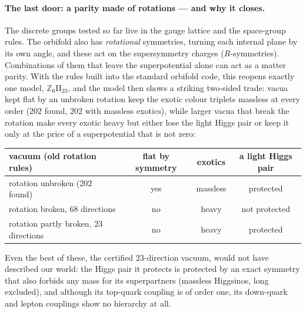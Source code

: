 \paragraph{The last door: a parity made of rotations --- and why it closes.}
The discrete groups tested so far live in the gauge lattice and the space-group rules. The orbifold
also has \emph{rotational} symmetries, turning each internal plane by its own angle, and these act on
the supersymmetry charges ($R$-symmetries). Combinations of them that leave the superpotential alone
can act as a matter parity. With the rules built into the standard orbifold code, this reopens exactly
one model, $\mathbb{Z}_6$II$_{23}$, and the model then shows a striking two-sided trade: vacua kept flat
by an unbroken rotation keep the exotic colour triplets massless at every order ($202$ found, $202$ with
massless exotics), while larger vacua that break the rotation make every exotic heavy but either lose
the light Higgs pair or keep it only at the price of a superpotential that is not zero:
\begin{center}
\small
\begin{tabular}{lccc}
\toprule
vacuum (old rotation rules) & flat by symmetry & exotics & a light Higgs pair \\
\midrule
rotation unbroken ($202$ found) & yes & massless & protected \\
rotation broken, $68$ directions & no & heavy & not protected \\
rotation partly broken, $23$ directions & no & heavy & protected \\
\bottomrule
\end{tabular}
\end{center}
Even the best of these, the certified $23$-direction vacuum, would not have described our world: the
Higgs pair it protects is protected by an exact symmetry that also forbids any mass for its
superpartners (massless Higgsinos, long excluded), and although its top-quark coupling is of order
one, its down-quark and lepton couplings show no hierarchy at all.

